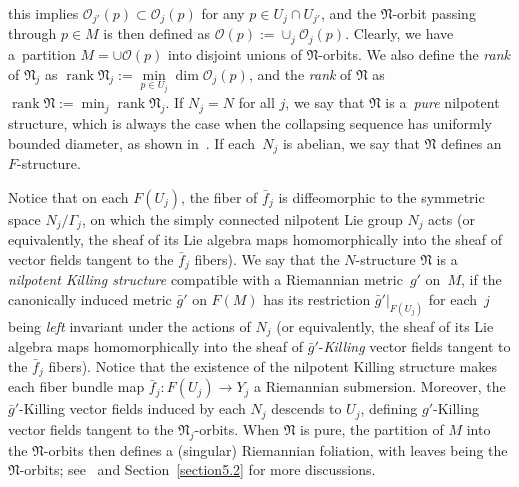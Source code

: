 \documentclass[pdftex]{sigma}
\numberwithin{equation}{section}
\newcommand{\rank}{\operatorname{rank}}
\begin{document}
this implies $\mathcal{O}_{j'}(p)\subset \mathcal{O}_j(p)$ for any $p\in
U_j\cap U_{j'}$, and the $\mathfrak{N}$-orbit passing through $p\in M$ is then
defined as $\mathcal{O}(p):=\cup_j \mathcal{O}_j(p)$. Clearly, we have a~partition $M=\cup \mathcal{O}(p)$ into disjoint unions of $\mathfrak{N}$-orbits.
We also define the \emph{rank} of $\mathfrak{N}_j$ as $\rank
\mathfrak{N}_j:=\min\limits_{p\in U_j}\dim \mathcal{O}_j(p)$, and the \emph{rank} of
$\mathfrak{N}$ as $\rank \mathfrak{N}:=\min_j\rank \mathfrak{N}_j$. If
$N_j=N$ for all $j$, we say that $\mathfrak{N}$ is a~\emph{pure} nilpotent
structure, which is always the case when the collapsing sequence has uniformly
bounded diameter, as shown in~\cite{Fukaya89}. If each~$N_j$ is abelian, we say
that $\mathfrak{N}$ defines an $F$-structure.

Notice that on each $F(U_j)$, the fiber of $\bar{f}_j$ is diffeomorphic to the
symmetric space $N_j\slash \Gamma_j$, on which the simply connected nilpotent
Lie group $N_j$ acts (or equivalently, the sheaf of its Lie algebra maps
homomorphically into the sheaf of vector fields tangent to the $\bar{f}_j$
fibers). We say that the $N$-structure $\mathfrak{N}$ is a \emph{nilpotent
Killing structure} compatible with a Riemannian metric~$g'$ on~$M$, if the
canonically induced metric $\bar{g}'$ on $F(M)$ has its restriction
$\bar{g}'|_{F(U_j)}$ for each~$j$ being \emph{left} invariant under the actions
of $N_j$ (or equivalently, the sheaf of its Lie algebra maps homomorphically
into the sheaf of $\bar{g}'$-\emph{Killing} vector fields tangent to the
$\bar{f}_j$ fibers). Notice that the existence of the nilpotent Killing
structure makes each fiber bundle map $\bar{f}_j\colon F(U_j)\to Y_j$ a Riemannian
submersion. Moreover, the $\bar{g}'$-Killing vector fields induced by each
$N_j$ descends to $U_j$, defining $g'$-Killing vector fields tangent to the
$\mathfrak{N}_j$-orbits. When $\mathfrak{N}$ is pure, the partition
of $M$ into the $\mathfrak{N}$-orbits then defines a (singular) Riemannian
foliation, with leaves being the $\mathfrak{N}$-orbits; see~\cite{Molino88} and
Section~\ref{section5.2} for more discussions.
\end{document}
